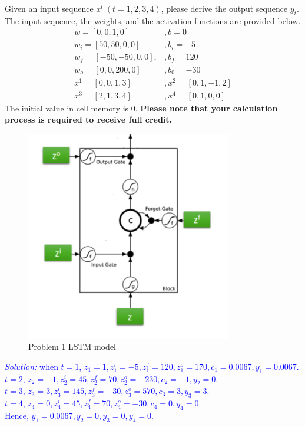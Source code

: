 \documentclass{article}
\def\solColor{blue}
\begin{document}
Given an input sequence $x^t\ ( t = 1, 2, 3, 4 )$, please derive the output sequence $y_t$. The input sequence, the weights, and the activation functions are provided below. 
\begin{equation*}
\begin{array}{ll}
w=[0,0,1,0] & , b=0 \\
w_i=[50,50,0,0] & , b_i=-5 \\
w_f=[-50,-50,0,0], & , b_f=120 \\
w_o=[0,0,200,0] & , b_0=-30\\
x^1 = [0,0,1,3] &,x^2=[0,1,-1,2]\\
x^3=[2,1,3,4]&, x^4=[0,1,0,0]
\end{array}
\end{equation*}
The initial value in cell memory is 0. \textbf{Please note that your calculation process is required to receive full credit.}
\newpage
\begin{figure}[h]
    \centering
    \includegraphics[width=0.8\textwidth]{LSTM.png}
    \caption{Problem 1 LSTM model}
\end{figure}

\textcolor{\solColor}{\textit{Solution:}
when $t=1$, $z_1=1, z_1^i=-5, z_1^f=120, z_1^o=170, c_1=0.0067, y_1=0.0067$. \\ 
$t=2$, $z_2=-1, z_2^i=45, z_2^f=70, z_2^o=-230, c_2=-1, y_2=0$. \\
$t=3$, $z_3=3, z_3^i=145, z_3^f=-30, z_3^o=570, c_3=3, y_3=3$. \\
$t=4$, $z_4=0, z_4^i=45, z_4^f=70, z_4^o=-30, c_4=0, y_4=0$. \\
Hence, $ y_1=0.0067, y_2=0, y_3=0, y_4=0.$
}
\end{document}
